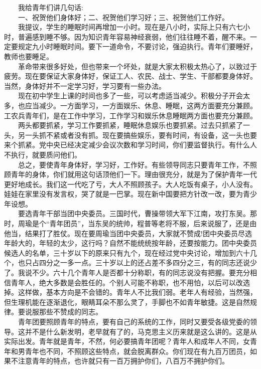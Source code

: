 \documentclass[cn,11pt,chinese]{elegantbook}
\begin{document}
　　我给青年们讲几句话:\\
　　一、祝贺他们身体好；二、祝贺他们学习好；三、祝贺他们工作好。\\
　　我提议，学生的睡眠时间再增加一小时。现在是八小时，实际上只有六七小时，普遍感到睡不够。因为知识青年容易神经衰弱，他们往往睡不着，醒不来。一定要规定九小时睡眠时间。要下一道命令，不要讨论，强迫执行。青年们要睡好，教师也要睡足。\\
　　革命带来很多好处，但也带来一个坏处，就是大家太积极太热心了，以致过于疲劳。现在要保证大家身体好，保证工人、农民、战士、学生、干部都要身体好。当然，身体好并不一定学习好，学习要有一些办法。\\
　　现在初中学生上课的时间也多了一些，可以考虑适当减少。积极分子开会太多，也应当减少。一方面学习，一方面娱乐、休息、睡眠，这两方面要充分兼顾。工农兵青年们，是在工作中学习，工作学习和娱乐休息睡眠两方面也要充分兼顾。\\
　　两头都要抓紧，学习工作要抓紧，睡眠休息娱乐也要抓紧。过去只抓紧了一头，另一头抓不紧或者没有抓。现在要搞些娱乐，要有时间，有设备，这一头也要来个抓紧。党中央已经决定减少会议次数和学习时间，你们要监督执行。有什么人不执行，就要质问他们。\\
　　总之，要使青年身体好，学习好，工作好。有些领导同志只要青年工作，不照顾青年的身体，你们就用这句话顶他们一下。理由很充分，就是为了保护青年一代更好地成长。我们这一代吃了亏，大人不照顾孩子。大人吃饭有桌子，小人没有。娃娃在家里没有发言权，哭了就是一巴掌。现在新中国要把方针改一改，要为青少年设想。\\
　　要选青年干部当团中央委员。三国时代，曹操带领大军下江南，攻打东吴。那时，周瑜是个“青年团员”，当东吴的统帅，程普等老将不服，后来说服了，还是由他当，结果打了胜仗。现在要周瑜当团中央委员，大家就不赞成!团中央委员尽选年龄大的，年轻的太少，这行吗？自然不能统统按年龄，还要按能力。团中央委员候选人的名单，三十岁以下的原来只有九个，现在经过党中央讨论，增加到六十几个，也只占四分之一多一点。三十岁以上的还占差不多四分之三，有的同志还说少了。我说不少。六十几个青年人是否都十分称职，有的同志说没有把握。要充分相信青年人，绝大多数是会胜任的。个别人可能不称职，也不用怕，以后可以改选掉。这样做，基本方向是不会错的。青年人不比我们弱。老年人有经验，当然强，但生理机能在逐渐退化，眼睛耳朵不那么灵了，手脚也不如青年敏捷。这是自然规律。要说服那些不赞成的同志。\\
　　青年团要照顾青年的特点，要有自己的系统的工作，同时又要受各级党委的领导。这并不是什么新发明，老早就有了的，马克思主义历来就是这么讲的。这是从实际出发。青年就是青年，不然，何必要搞青年团呢？青年人和成年人不同，女青年和男青年也不同，不照顾这些特点，就会脱离群众。你们现在有九百万团员，如果不注意青年的特点，也许就只有一百万拥护你们，八百万不拥护你们。\\
\end{document}
